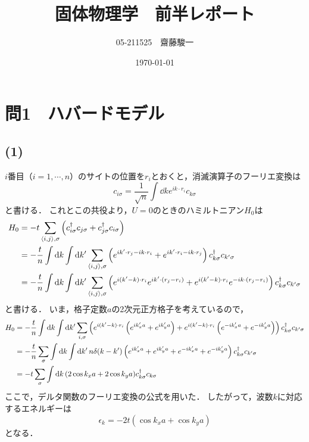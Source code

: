 \documentclass[a4paper,11pt]{jsarticle}
\begin{document}
\title{固体物理学　前半レポート}
\author{05-211525　齋藤駿一}
\date{\today}
\maketitle

\section*{問1　ハバードモデル}
\subsection*{(1)}
$i$番目（$i=1,\cdots,n$）のサイトの位置を$r_i$とおくと，消滅演算子のフーリエ変換は
\begin{equation}
  c_{i\sigma} = \frac{1}{\sqrt{n}}\int \dd{k} e^{ik\cdot r_i} c_{k\sigma} 
\end{equation}
と書ける．
これとこの共役より，$U=0$のときのハミルトニアン$H_0$は
\begin{align}
  H_0 &= -t \sum_{\langle i,j\rangle,\sigma}\left(c^{\dagger}_{i\sigma}c_{j\sigma} + c^{\dagger}_{j\sigma}c_{i\sigma}\right)\notag\\
  &= -\frac{t}{n} \int \dd{k} \int \dd{k'} \sum_{\langle i,j\rangle,\sigma} \left(e^{ik'\cdot r_j - ik\cdot r_i} + e^{ik'\cdot r_i - ik\cdot r_j}\right) c^{\dagger}_{k\sigma} c_{k'\sigma} \notag\\
  &= -\frac{t}{n} \int \dd{k} \int \dd{k'} \sum_{\langle i,j\rangle,\sigma} \left(e^{i(k'-k)\cdot r_i}e^{ik'\cdot (r_j - r_i)} + e^{i(k'-k)\cdot r_i} e^{-ik\cdot (r_j - r_i)}\right) c^{\dagger}_{k\sigma} c_{k'\sigma} \notag
\end{align}
と書ける．
いま，格子定数$a$の2次元正方格子を考えているので，
\begin{align}
  H_0 &= -\frac{t}{n} \int \dd{k} \int \dd{k'} \sum_{i,\sigma} \left(e^{i(k'-k)\cdot r_i}\left(e^{ik'_xa} + e^{ik'_ya} \right)+ e^{i(k'-k)\cdot r_i} \left(e^{-ik'_xa} + e^{-ik'_ya} \right)\right) c^{\dagger}_{k\sigma} c_{k'\sigma}\notag\\
  &= - \frac{t}{n} \sum_{\sigma}\int \dd{k} \int \dd{k'} n\delta(k-k')\left(e^{ik'_xa} + e^{ik'_ya}+ e^{-ik'_xa} + e^{-ik'_ya} \right) c^{\dagger}_{k\sigma} c_{k'\sigma} \notag\\
  &= -t\sum_{\sigma}\int \dd{k} (2\cos{k_xa}+2\cos{k_ya})c^{\dagger}_{k\sigma} c_{k\sigma}
\end{align}
ここで，デルタ関数のフーリエ変換の公式を用いた．
したがって，波数$k$に対応するエネルギーは
\begin{equation}
  \epsilon_k = -2t(\cos{k_xa}+\cos{k_ya}) \label{eps_k}
\end{equation}
となる．
\end{document}
